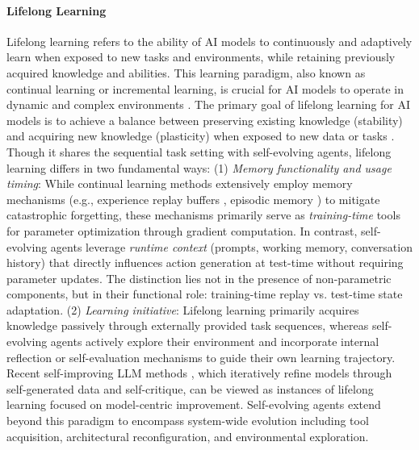 \paragraph{Lifelong Learning}
Lifelong learning refers to the ability of AI models to continuously and adaptively learn when exposed to new tasks and environments, while retaining previously acquired knowledge and abilities. This learning paradigm, also known as continual learning or incremental learning, is crucial for AI models to operate in dynamic and complex environments \citep{wang2024comprehensive, zheng2025lifelong, parisi2019continual, shi2024continual, yang2025recent, zhou2024continual}. The primary goal of lifelong learning for AI models is to achieve a balance between preserving existing knowledge (stability) and acquiring new knowledge (plasticity) when exposed to new data or tasks \citep{mccloskey1989catastrophic, zheng2025lifelong, ratcliff1990connectionist, rolnick2019experience}. Though it shares the sequential task setting with self-evolving agents, lifelong learning differs in two fundamental ways: (1) \textit{Memory functionality and usage timing}: While continual learning methods extensively employ memory mechanisms (e.g., experience replay buffers \citep{rolnick2019experience}, episodic memory \citep{lopez2017gradient}) to mitigate catastrophic forgetting, these mechanisms primarily serve as \emph{training-time} tools for parameter optimization through gradient computation. In contrast, self-evolving agents leverage \emph{runtime context} (prompts, working memory, conversation history) that directly influences action generation at test-time without requiring parameter updates. The distinction lies not in the presence of non-parametric components, but in their functional role: training-time replay vs. test-time state adaptation. (2) \textit{Learning initiative}: Lifelong learning primarily acquires knowledge passively through externally provided task sequences, whereas self-evolving agents actively explore their environment and incorporate internal reflection or self-evaluation mechanisms to guide their own learning trajectory. Recent self-improving LLM methods \citep{huang2022large, yuan2024self}, which iteratively refine models through self-generated data and self-critique, can be viewed as instances of lifelong learning focused on model-centric improvement. Self-evolving agents extend beyond this paradigm to encompass system-wide evolution including tool acquisition, architectural reconfiguration, and environmental exploration.

